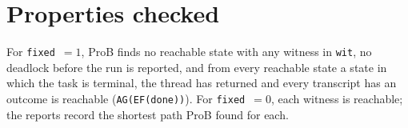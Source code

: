 \documentclass[a4paper,10pt,fleqn]{article}
\newcommand{\field}[1]{\texttt{#1}}
\begin{document}
\section{Properties checked}
\label{sec:props}

For \field{fixed}~$=1$, ProB finds no reachable state with any witness in
\field{wit}, no deadlock before the run is reported, and from every reachable
state a state in which the task is terminal, the thread has returned and
every transcript has an outcome is reachable (\field{AG(EF(done))}). For
\field{fixed}~$=0$, each witness is reachable; the reports record the shortest
path ProB found for each.
\end{document}
